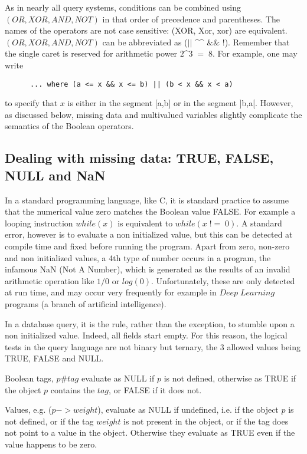 \documentclass[11pt]{article}
\newcommand{\BL}{\begin{lstlisting}}
\begin{document}
As in nearly all query systems, conditions can be combined using $(OR, XOR, AND, NOT)$ 
in that order of precedence and parentheses. The names of the operators 
are not case sensitive: (XOR, Xor, xor) are equivalent.
$(OR, XOR, AND, NOT)$ can be abbreviated as ($||$ \^{ }\^{ }  $\&\&$ $!$).
Remember that the single caret is reserved for arithmetic power $2$\^{ }$3 \; = \;8$.
For example, one may write
\BL
      ... where (a <= x && x <= b) || (b < x && x < a) 
\end{lstlisting}
to specify that $x$ is either in the segment [a,b] or in the segment ]b,a[.
However, as discussed below, missing data and multivalued variables
slightly complicate the semantics of the Boolean operators. 


\subsection{Dealing with missing data: TRUE, FALSE, NULL and NaN}

In a standard programming language, like C, it is standard practice to
assume that the numerical value zero matches the Boolean value FALSE.
For example a looping instruction $while(x)$ is equivalent
to $while(x\;!=\;0)$. A standard error, however is to evaluate
a non initialized value, but this can be detected at compile time and fixed
before running the program. Apart from zero, non-zero and non initialized values,
a 4th type of number occurs in a program, the infamous NaN (Not A Number), which is generated
as the results of an invalid arithmetic operation like $1/0$ or $log(0)$.
Unfortunately, these are only detected at run time, and may occur very frequently for
example in $Deep\;Learning$ programs (a branch of artificial intelligence).

In a database query, it is the rule, rather than the exception, to stumble
upon a non initialized value. Indeed, all fields start empty. For this
reason, the logical tests in the query language are not binary but ternary,
the 3 allowed values being TRUE, FALSE and NULL. 

Boolean tags, $p\#tag$ evaluate as NULL if $p$ is not defined, otherwise as TRUE
if the object $p$ contains the $tag$, or FALSE if it does not.

Values, e.g. ($p$$-$$>$$weight$), evaluate as NULL if undefined, i.e. if the object $p$ is not defined, 
or if the tag $weight$ is not present in the object, or if the tag does not point to a value in the object.
Otherwise they evaluate as TRUE even if the value happens to be zero.
\end{document}
